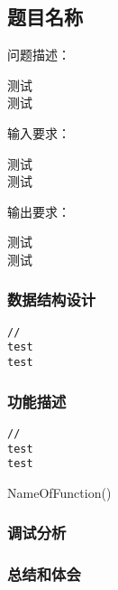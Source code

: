\subsection{题目名称}
\begin{formal}
    {\cuhei 问题描述：}

    测试\\
    测试
\end{formal}
\begin{formal}
    {\cuhei 输入要求：}

    测试\\
    测试
\end{formal}
\begin{formal}
    {\cuhei 输出要求：}

    测试\\
    测试
\end{formal}
\subsubsection{数据结构设计}
\begin{lstlisting}[name=Q1]
//
test
test
\end{lstlisting}
\subsubsection{功能描述}
\begin{lstlisting}[name=F11]
//
test
test
\end{lstlisting}
\begin{function}
    \;
    \caption{NameOfFunction()}
\end{function}
\subsubsection{调试分析}
\subsubsection{总结和体会}